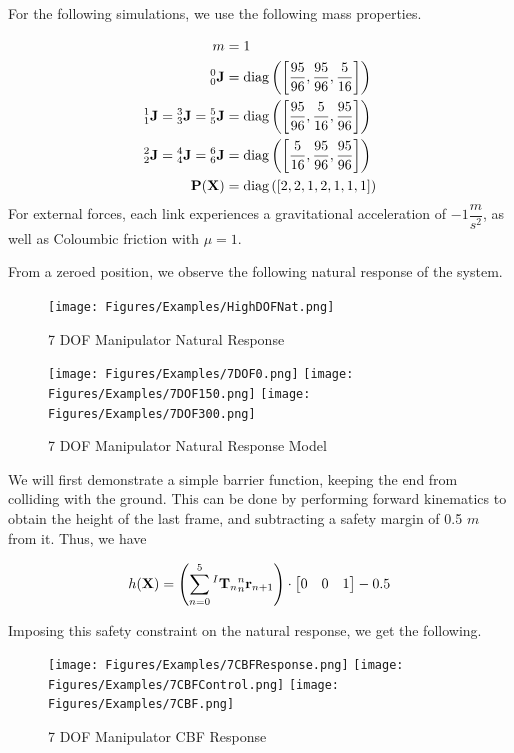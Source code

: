 \noindent For the following simulations, we use the following mass properties.

\begin{align*}
    m &= 1\\
    {^0_0}\mathbf{J} &=  \text{diag}\left (\left [\dfrac{95}{96}, \dfrac{95}{96},  \dfrac{5}{16} \right ] \right )\\
    {^1_1}\mathbf{J} = {^3_3}\mathbf{J} = {^5_5}\mathbf{J} &=  \text{diag}\left (\left [ \dfrac{95}{96}, \dfrac{5}{16}, \dfrac{95}{96} \right ]\right ) \\
    {^2_2}\mathbf{J} = {^4_4}\mathbf{J} = {^6_6}\mathbf{J} &=  \text{diag}\left (\left [ \dfrac{5}{16}, \dfrac{95}{96}, \dfrac{95}{96} \right ]\right ) \\
    \mathbf{P}(\mathbf{X}) &= \text{diag} \left (\left [2, 2, 1, 2, 1, 1, 1 \right] \right )
\end{align*}
\noindent For external forces,  each link experiences a gravitational acceleration of $-1 \dfrac{m}{s^2}$, as well as Coloumbic friction with $\mu = 1$. \newline

\noindent From a zeroed position, we observe the following natural response of the system.

\begin{figure}[H]
    \centering
    \texttt{[image: Figures/Examples/HighDOFNat.png]}
    \caption{7 DOF Manipulator Natural Response}
    \label{fig:HighDOFNat}
    \texttt{[image: Figures/Examples/7DOF0.png]}
    \texttt{[image: Figures/Examples/7DOF150.png]}
    \texttt{[image: Figures/Examples/7DOF300.png]}
    \caption{7 DOF Manipulator Natural Response Model}
\end{figure}

\noindent We will first demonstrate a simple barrier function, keeping the end from colliding with the ground. This can be done by performing forward kinematics to obtain the height of the last frame, and subtracting a safety margin of 0.5 $m$ from it. Thus, we have

\begin{align}
    h(\mathbf{X}) = \left (\sum_{n=0}^5 {^I\mathbf{T}_n}{^n_n\mathbf{r}_{n+1}} \right) \cdot \begin{bmatrix} 0 & 0 & 1\end{bmatrix} - 0.5
\end{align}

\noindent Imposing this safety constraint on the natural response, we get the following.

\begin{figure}[H]
    \centering
    \texttt{[image: Figures/Examples/7CBFResponse.png]}
    \texttt{[image: Figures/Examples/7CBFControl.png]}
    \texttt{[image: Figures/Examples/7CBF.png]}
    \caption{7 DOF Manipulator CBF Response}
    \label{fig:7DOFCBFResponse1}
\end{figure}


